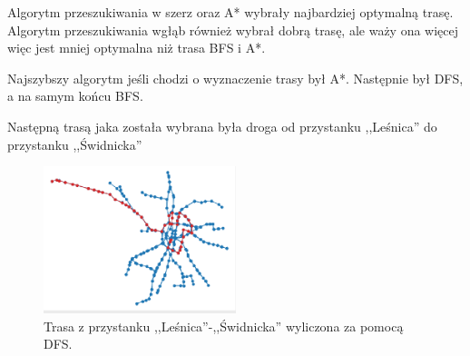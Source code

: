\documentclass[12pt, polish]{article}
\begin{document}
Algorytm przeszukiwania w szerz oraz A* wybrały najbardziej optymalną trasę. Algorytm przeszukiwania wgłąb również wybrał dobrą trasę, ale waży ona więcej więc jest mniej optymalna niż trasa BFS i A*.

Najszybszy algorytm jeśli chodzi o wyznaczenie trasy był A*. Następnie był DFS, a na samym końcu BFS.

\newpage
Następną trasą jaka została wybrana była droga od przystanku ,,Leśnica'' do przystanku ,,Świdnicka''
\begin{figure}[ht]
	\centering

\includegraphics[width=0.5\textwidth]{images/mapa_lesnica-swidnicka.png}

\caption{Trasa z przystanku ,,Leśnica''-,,Świdnicka'' wyliczona za pomocą DFS.}
\end{figure}
\end{document}
